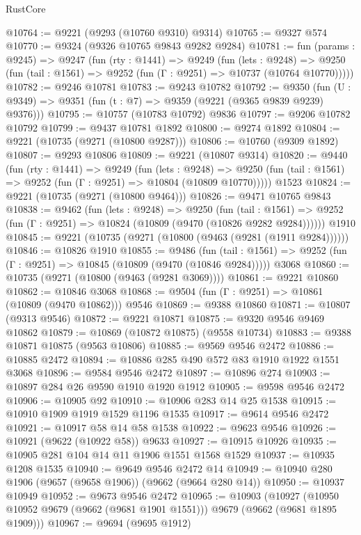 \begin{lexlean}{RustCore}
\begin{coremodule}
@10764 := @9221 (@9293 (@10760 @9310) @9314)
@10765 := @9327 @574
@10770 := @9324 (@9326 @10765 @9843 @9282 @9284)
@10781 := fun (params : @9245) =>
  @9247
    (fun (rty : @1441) =>
    @9249
      (fun (lets : @9248) =>
      @9250 (fun (tail : @1561) => @9252 (fun (Γ : @9251) => @10737 (@10764 @10770)))))
@10782 := @9246 @10781
@10783 := @9243 @10782
@10792 := @9350 (fun (U : @9349) => @9351 (fun (t : @7) => @9359 (@9221 (@9365 @9839 @9239) @9376)))
@10795 := @10757 (@10783 @10792) @9836
@10797 := @9206 @10782 @10792
@10799 := @9437 @10781 @1892
@10800 := @9274 @1892
@10804 := @9221 (@10735 (@9271 (@10800 @9287)))
@10806 := @10760 (@9309 @1892)
@10807 := @9293 @10806
@10809 := @9221 (@10807 @9314)
@10820 := @9440
    (fun (rty : @1441) =>
    @9249
      (fun (lets : @9248) =>
      @9250 (fun (tail : @1561) => @9252 (fun (Γ : @9251) => @10804 (@10809 @10770)))))
    @1523
@10824 := @9221 (@10735 (@9271 (@10800 @9464)))
@10826 := @9471 @10765 @9843
@10838 := @9462
    (fun (lets : @9248) =>
    @9250
      (fun (tail : @1561) =>
      @9252 (fun (Γ : @9251) => @10824 (@10809 (@9470 (@10826 @9282 @9284))))))
    @1910
@10845 := @9221 (@10735 (@9271 (@10800 (@9463 (@9281 (@1911 @9284))))))
@10846 := @10826 @1910
@10855 := @9486
    (fun (tail : @1561) => @9252 (fun (Γ : @9251) => @10845 (@10809 (@9470 (@10846 @9284)))))
    @3068
@10860 := @10735 (@9271 (@10800 (@9463 (@9281 @3069))))
@10861 := @9221 @10860
@10862 := @10846 @3068
@10868 := @9504 (fun (Γ : @9251) => @10861 (@10809 (@9470 @10862))) @9546
@10869 := @9388 @10860
@10871 := @10807 (@9313 @9546)
@10872 := @9221 @10871
@10875 := @9320 @9546 @9469 @10862
@10879 := @10869 (@10872 @10875) (@9558 @10734)
@10883 := @9388 @10871 @10875 (@9563 @10806)
@10885 := @9569 @9546 @2472
@10886 := @10885 @2472
@10894 := @10886 @285 @490 @572 @83 @1910 @1922 @1551 @3068
@10896 := @9584 @9546 @2472
@10897 := @10896 @274
@10903 := @10897 @284 @26 @9590 @1910 @1920 @1912
@10905 := @9598 @9546 @2472
@10906 := @10905 @92
@10910 := @10906 @283 @14 @25 @1538
@10915 := @10910 @1909 @1919 @1529 @1196 @1535
@10917 := @9614 @9546 @2472
@10921 := @10917 @58 @14 @58 @1538
@10922 := @9623 @9546
@10926 := @10921 (@9622 (@10922 @58)) @9633
@10927 := @10915 @10926
@10935 := @10905 @281 @104 @14 @11 @1906 @1551 @1568 @1529
@10937 := @10935 @1208 @1535
@10940 := @9649 @9546 @2472 @14
@10949 := @10940 @280 @1906 (@9657 (@9658 @1906)) (@9662 (@9664 @280 @14))
@10950 := @10937 @10949
@10952 := @9673 @9546 @2472
@10965 := @10903
    (@10927 (@10950 @10952 @9679 (@9662 (@9681 @1901 @1551))) @9679 (@9662 (@9681 @1895 @1909)))
@10967 := @9694 (@9695 @1912)

\end{coremodule}
\end{lexlean}
